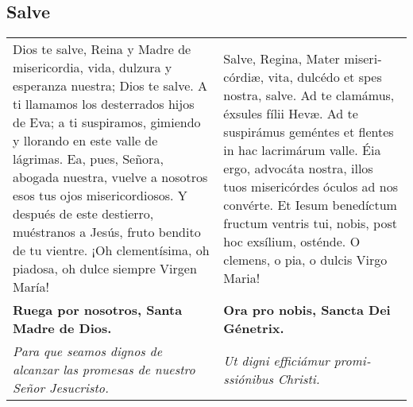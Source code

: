 \documentclass[./devocionario.tex]{subfiles}
\begin{document}
    \subsection*{Salve}
    \begin{longtable} { p{} p{} }
        Dios te salve, Reina y Madre de mi­se­ri­cordia, vida, dulzura y esperanza nuestra; Dios te salve. 
        A ti llamamos los desterrados hijos de Eva; a ti suspiramos, gimiendo y llorando en este valle de lágrimas. 
        Ea, pues, Señora, abogada nuestra, vuelve a nosotros esos tus ojos mi­se­ri­cordiosos. Y después de este destierro, muéstranos a Jesús, 
        fruto bendito de tu vientre. ¡Oh cle­men­tísima, oh piadosa, oh dulce siempre Virgen María!

        &

        Salve, Regina, Mater mi­se­ri­córdiæ, vita, dulcédo et spes nostra, salve. Ad te clamámus, éxsules fílii Hevæ. 
        Ad te suspirámus geméntes et flentes in hac lacrimárum valle. Éia ergo, advocáta nostra, illos tuos mi­se­ri­córdes óculos ad nos convérte. 
        Et Iesum benedíctum fructum ventris tui, nobis, post hoc exsílium, osténde. O clemens, o pia, o dulcis Virgo Maria!\\
        
        \textbf{Ruega por nosotros, Santa Madre de Dios.} & \textbf{Ora pro nobis, Sancta Dei Génetrix.}\\
        
        \textit{Para que seamos dignos de alcanzar las promesas de nuestro Señor Jesucristo.}

        &

        \textit{Ut digni efficiámur pro­mi­ssiónibus Christi.}
    \end{longtable}
    
\end{document}
